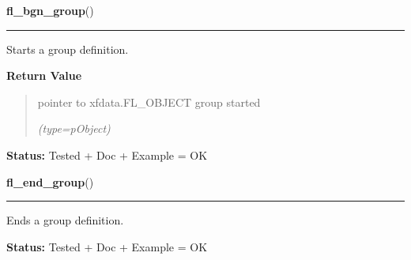     \label{xformslib:library:fl_bgn_group}

    \vspace{0.5ex}

\hspace{.8\funcindent}\begin{boxedminipage}{\funcwidth}

    \raggedright \textbf{fl\_bgn\_group}()

    \vspace{-1.5ex}

    \rule{\textwidth}{0.5\fboxrule}
\setlength{\parskip}{2ex}
    Starts a group definition.

\setlength{\parskip}{1ex}
      \textbf{Return Value}
    \vspace{-1ex}

      \begin{quote}
      pointer to xfdata.FL\_OBJECT group started

      {\it (type=pObject)}

      \end{quote}

\textbf{Status:} Tested + Doc + Example = OK



    \end{boxedminipage}

    \label{xformslib:library:fl_end_group}

    \vspace{0.5ex}

\hspace{.8\funcindent}\begin{boxedminipage}{\funcwidth}

    \raggedright \textbf{fl\_end\_group}()

    \vspace{-1.5ex}

    \rule{\textwidth}{0.5\fboxrule}
\setlength{\parskip}{2ex}
    Ends a group definition.

\setlength{\parskip}{1ex}
\textbf{Status:} Tested + Doc + Example = OK



    \end{boxedminipage}

    \label{xformslib:library:fl_addto_group}

